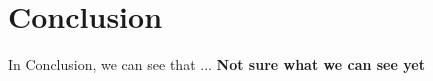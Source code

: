 \chapter{Conclusion}
\label{sec:conclusion}

In Conclusion, we can see that ... \textbf{Not sure what we can see yet}


